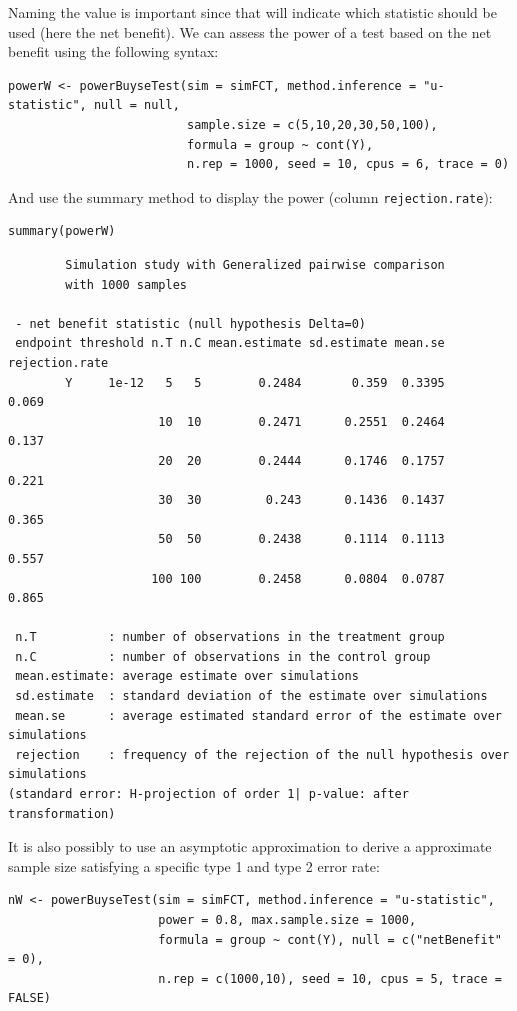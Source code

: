 \documentclass[12pt]{article}
\begin{document}
Naming the value is important since that will indicate which statistic
should be used (here the net benefit). We can assess the power of a
test based on the net benefit using the following syntax:
\lstset{language=r,label= ,caption= ,captionpos=b,numbers=none}
\begin{lstlisting}
powerW <- powerBuyseTest(sim = simFCT, method.inference = "u-statistic", null = null,
                         sample.size = c(5,10,20,30,50,100),                         
                         formula = group ~ cont(Y), 
                         n.rep = 1000, seed = 10, cpus = 6, trace = 0)
\end{lstlisting}

\clearpage

And use the summary method to display the power (column
\texttt{rejection.rate}):
\lstset{language=r,label= ,caption= ,captionpos=b,numbers=none}
\begin{lstlisting}
summary(powerW)
\end{lstlisting}

\begin{verbatim}
        Simulation study with Generalized pairwise comparison
        with 1000 samples

 - net benefit statistic (null hypothesis Delta=0)
 endpoint threshold n.T n.C mean.estimate sd.estimate mean.se rejection.rate
        Y     1e-12   5   5        0.2484       0.359  0.3395          0.069
                     10  10        0.2471      0.2551  0.2464          0.137
                     20  20        0.2444      0.1746  0.1757          0.221
                     30  30         0.243      0.1436  0.1437          0.365
                     50  50        0.2438      0.1114  0.1113          0.557
                    100 100        0.2458      0.0804  0.0787          0.865

 n.T          : number of observations in the treatment group
 n.C          : number of observations in the control group
 mean.estimate: average estimate over simulations
 sd.estimate  : standard deviation of the estimate over simulations
 mean.se      : average estimated standard error of the estimate over simulations
 rejection    : frequency of the rejection of the null hypothesis over simulations
(standard error: H-projection of order 1| p-value: after transformation)
\end{verbatim}

It is also possibly to use an asymptotic approximation to derive a
approximate sample size satisfying a specific type 1 and type 2 error
rate:
\lstset{language=r,label= ,caption= ,captionpos=b,numbers=none}
\begin{lstlisting}
nW <- powerBuyseTest(sim = simFCT, method.inference = "u-statistic", 
                     power = 0.8, max.sample.size = 1000,                     
                     formula = group ~ cont(Y), null = c("netBenefit" = 0),
                     n.rep = c(1000,10), seed = 10, cpus = 5, trace = FALSE)
\end{lstlisting}
\end{document}
